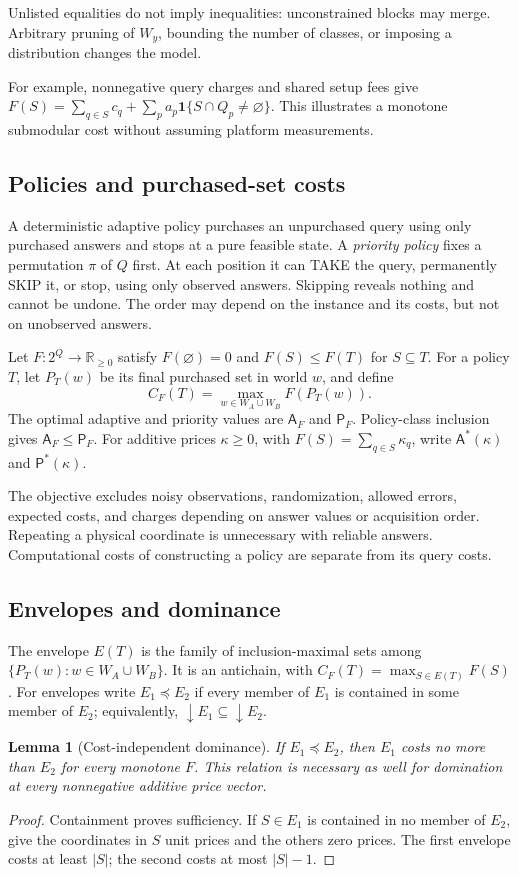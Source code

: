 \documentclass[pdflatex,sn-mathphys-num]{sn-jnl}
\newcommand{\A}{\mathsf{A}}
\newcommand{\Pcost}{\mathsf{P}}
\newcommand{\down}{\mathop{\downarrow}}
\theoremstyle{thmstyleone}
\newtheorem{lemma}[theorem]{Lemma}
\theoremstyle{thmstylethree}
\theoremstyle{thmstyletwo}
\begin{document}
Unlisted equalities do not imply inequalities: unconstrained blocks may merge. Arbitrary pruning of $W_y$, bounding the number of classes, or imposing a distribution changes the model.

For example, nonnegative query charges and shared setup fees give
$F(S)=\sum_{q\in S}c_q+\sum_p a_p\mathbf1\{S\cap Q_p\ne\varnothing\}$.
This illustrates a monotone submodular cost without assuming platform measurements.

\subsection{Policies and purchased-set costs}
A deterministic adaptive policy purchases an unpurchased query using only purchased answers and stops at a pure feasible state. A \emph{priority policy} fixes a permutation $\pi$ of $Q$ first. At each position it can TAKE the query, permanently SKIP it, or stop, using only observed answers. Skipping reveals nothing and cannot be undone. The order may depend on the instance and its costs, but not on unobserved answers.

Let $F:2^Q\to\mathbb R_{\geq0}$ satisfy $F(\varnothing)=0$ and $F(S)\leq F(T)$ for $S\subseteq T$. For a policy $T$, let $P_T(w)$ be its final purchased set in world $w$, and define
\[
 C_F(T)=\max_{w\in W_A\cup W_B} F(P_T(w)).
\]
The optimal adaptive and priority values are $\A_F$ and $\Pcost_F$. Policy-class inclusion gives $\A_F\leq\Pcost_F$. For additive prices $\kappa\geq0$, with $F(S)=\sum_{q\in S}\kappa_q$, write $\A^*(\kappa)$ and $\Pcost^*(\kappa)$.

The objective excludes noisy observations, randomization, allowed errors, expected costs, and charges depending on answer values or acquisition order. Repeating a physical coordinate is unnecessary with reliable answers. Computational costs of constructing a policy are separate from its query costs.

\subsection{Envelopes and dominance}\label{sec:envelopes}
The envelope $E(T)$ is the family of inclusion-maximal sets among $\{P_T(w):w\in W_A\cup W_B\}$. It is an antichain, with $C_F(T)=\max_{S\in E(T)}F(S)$. For envelopes write $E_1\preceq E_2$ if every member of $E_1$ is contained in some member of $E_2$; equivalently, $\down E_1\subseteq\down E_2$.

\begin{lemma}[Cost-independent dominance]\label{lem:dominance}
If $E_1\preceq E_2$, then $E_1$ costs no more than $E_2$ for every monotone $F$. This relation is necessary as well for domination at every nonnegative additive price vector.
\end{lemma}
\begin{proof}
Containment proves sufficiency. If $S\in E_1$ is contained in no member of $E_2$, give the coordinates in $S$ unit prices and the others zero prices. The first envelope costs at least $|S|$; the second costs at most $|S|-1$.
\end{proof}
\end{document}
